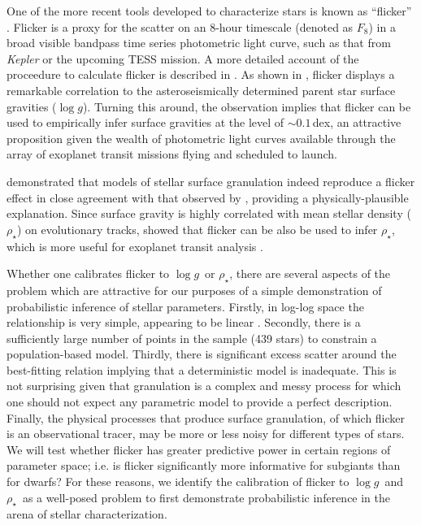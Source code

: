 \documentclass[apjl]{emulateapj}
\newcommand{\logg}{$\log g$}
\newcommand{\rhostar}{$\rho_{\star}$}
\begin{document}
One of the more recent tools developed to characterize stars is known as
``flicker'' \citep{bastien:2013}.
Flicker is a proxy for the scatter on an 8-hour timescale (denoted as $F_8$)
in a broad visible bandpass time series photometric light curve, such as that
from \textit{Kepler} or the upcoming TESS mission. A more detailed account of
the proceedure to calculate flicker is described in \citet{bastien:2013}. As
shown in \citet{bastien:2013}, flicker displays a remarkable correlation to
the asteroseismically determined parent star surface gravities (\logg).
Turning this around, the observation implies that flicker can be used to
empirically infer surface gravities at the level of $\sim0.1$\,dex, an
attractive proposition given the wealth of photometric light curves available
through the array of exoplanet transit missions flying and scheduled to
launch.

\citet{cranmer:2014} demonstrated that models of stellar surface granulation
indeed reproduce a flicker effect in close agreement with that observed by
\citet{bastien:2013}, providing a physically-plausible explanation.
Since surface gravity is highly correlated with mean stellar density (\rhostar)
on evolutionary tracks, \citet{kipping:2014} showed that flicker can be also
be used to infer \rhostar, which is more useful for exoplanet transit analysis
\citep{seager:2003}.

Whether one calibrates flicker to \logg\ or \rhostar, there are several aspects
of the problem which are attractive for our purposes of a simple demonstration
of probabilistic inference of stellar parameters.
Firstly, in log-log space the relationship is very simple, appearing to be
linear \citep{kipping:2014}.
Secondly, there is a sufficiently large number of points in the sample (439
stars) to constrain a population-based model.
Thirdly, there is significant excess scatter around the best-fitting relation
implying that a deterministic model is inadequate.
This is not surprising given that granulation is a complex and messy process
for which one should not expect any parametric model to provide a perfect
description.
Finally, the physical processes that produce surface granulation, of which
flicker is an observational tracer, may be more or less noisy for different
types of stars.
We will test whether flicker has greater predictive power in certain regions
of parameter space; i.e. is flicker significantly more informative for
subgiants than for dwarfs?
For these reasons, we identify the calibration of
flicker to \logg\ and \rhostar\ as a well-posed problem to first demonstrate
probabilistic inference in the arena of stellar characterization.
\end{document}
